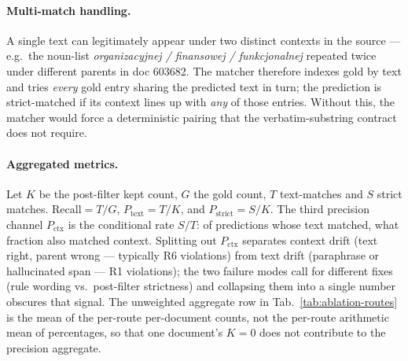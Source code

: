 \paragraph{Multi-match handling.}
A single text can legitimately appear under two distinct contexts in
the source --- e.g.\ the noun-list \textit{organizacyjnej /
finansowej / funkcjonalnej} repeated twice under different parents
in doc 603682. The matcher therefore indexes gold by text and tries
\emph{every} gold entry sharing the predicted text in turn; the
prediction is strict-matched if its context lines up with \emph{any}
of those entries. Without this, the matcher would force a deterministic
pairing that the verbatim-substring contract does not require.

\paragraph{Aggregated metrics.}
Let $K$ be the post-filter kept count, $G$ the gold count, $T$
text-matches and $S$ strict matches.
$\text{Recall} = T/G$, $P_{\text{text}} = T/K$, and
$P_{\text{strict}} = S/K$. The third precision channel
$P_{\text{ctx}}$ is the conditional rate $S/T$: of predictions
whose text matched, what fraction also matched context. Splitting
out $P_{\text{ctx}}$ separates context drift (text right, parent
wrong --- typically R6 violations) from text drift (paraphrase or
hallucinated span --- R1 violations); the two failure modes call for
different fixes (rule wording vs.\ post-filter strictness) and
collapsing them into a single number obscures that signal. The
unweighted aggregate row in Tab.~\ref{tab:ablation-routes} is the
mean of the per-route per-document counts, not the per-route
arithmetic mean of percentages, so that one document's $K=0$ does
not contribute to the precision aggregate.

